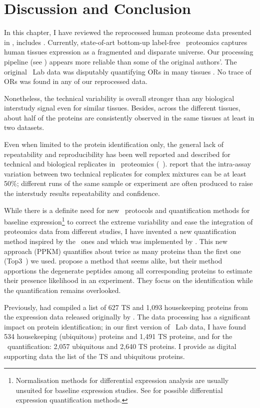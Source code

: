 
\section{Discussion and Conclusion}

In this chapter, I have reviewed the reprocessed human proteome data
presented in ,
includes \citet{PandeyData,KusterData}.
Currently, state-of-art bottom-up label-free \ms\ proteomics captures
human tissues expression as a fragmented and disparate universe.
Our processing pipeline (see )
appears more reliable than some of the original authors'.
The original \pandey\ Lab data was disputably quantifying \glspl{OR} in many tissues
.
No trace of \glspl{OR} was found in any of our reprocessed data.\mybr\

Nonetheless, the technical variability is overall stronger
than any biological interstudy signal even for similar tissues.
Besides, across the different tissues,
about half of the proteins are consistently observed
in the same tissues at least in two datasets.\mybr\

Even when limited to the protein identification only,
the general lack of repeatability and reproducibility
has been well reported and described
for technical and biological replicates in \ms\ proteomics
(\eg\ \citet{Tu2014-yj,Tabb2010-ro}).
\citet{Canterbury2014-oi} report that
the intra-assay variation between two technical replicates for complex mixtures
can be at least 50\%;
different runs of the same sample or experiment are often produced to raise
the interstudy results repeatability and confidence.\mybr\

While there is a definite need for new \ms\ protocols and quantification methods
for baseline expression\footnote{Normalisation methods for differential expression
analysis are usually unsuited for baseline expression studies.
See \citet{Valikangas2018-yj} for possible differential expression quantification
methods.} to correct the extreme variability
and ease the integration of proteomics data from different studies,
I have invented a new quantification method inspired by the \Rnaseq\ ones and
which was implemented by \james.
This new approach (\gls{PPKM}) quantifies
about twice as many proteins than the first one (Top3~) we used.
\citet{Nesvizhskii2003-ls} propose a method that seems alike,
but their method apportions the degenerate peptides
among all corresponding proteins to estimate their presence likelihood in an experiment.
They focus on the identification while the quantification remains overlooked.\mybr\

Previously, \citet{Liu2014-xr} had compiled a list of 627 \gls{TS} and
1,093 housekeeping proteins
from the expression data released originally by \citet{PandeyData}.
The data processing has a significant impact on protein identification;
in our first version of \pandey\ Lab data,
I have found 534 housekeeping (ubiquitous) proteins and 1,491 \gls{TS} proteins,
and for the \PPKM\ quantification: 2,057 ubiquitous and 2,640 \gls{TS} proteins.
I provide as digital supporting data the list of the \gls{TS} and
ubiquitous proteins.\mybr\

